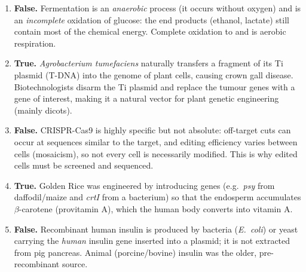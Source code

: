 \documentclass[11pt]{article}
\newcommand{\cle}[1]{{\popxbold\color{popdark}#1}}
\begin{document}
\begin{corrige}
\begin{enumerate}
\item \textbf{False.} Fermentation is an \emph{anaerobic} process (it occurs without oxygen) and is an \emph{incomplete} oxidation of glucose: the end products (ethanol, lactate) still contain most of the chemical energy. Complete oxidation to  and  is aerobic respiration.
\item \textbf{True.} \emph{Agrobacterium tumefaciens} naturally transfers a fragment of its Ti plasmid (T-DNA) into the genome of plant cells, causing crown gall disease. Biotechnologists disarm the Ti plasmid and replace the tumour genes with a gene of interest, making it a natural vector for plant genetic engineering (mainly dicots).
\item \textbf{False.} CRISPR-Cas9 is highly specific but not absolute: \cle{off-target} cuts can occur at sequences similar to the target, and editing efficiency varies between cells (mosaicism), so not every cell is necessarily modified. This is why edited cells must be screened and sequenced.
\item \textbf{True.} Golden Rice was engineered by introducing genes (e.g.\ \emph{psy} from daffodil/maize and \emph{crtI} from a bacterium) so that the endosperm accumulates $\beta$-carotene (provitamin A), which the human body converts into vitamin A.
\item \textbf{False.} Recombinant human insulin is produced by bacteria (\emph{E.~coli}) or yeast carrying the \emph{human} insulin gene inserted into a plasmid; it is not extracted from pig pancreas. Animal (porcine/bovine) insulin was the older, pre-recombinant source.
\end{enumerate}
\end{corrige}
\end{document}
